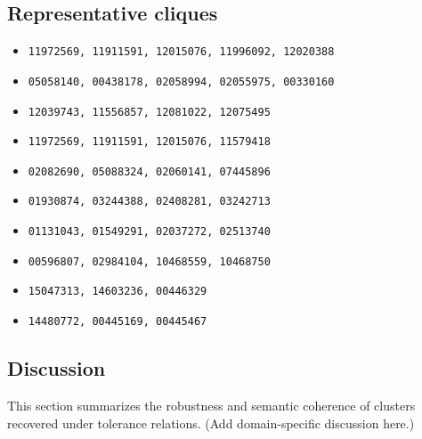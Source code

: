 \subsection{Representative cliques}
\begin{itemize}
\item \texttt{11972569, 11911591, 12015076, 11996092, 12020388}
\item \texttt{05058140, 00438178, 02058994, 02055975, 00330160}
\item \texttt{12039743, 11556857, 12081022, 12075495}
\item \texttt{11972569, 11911591, 12015076, 11579418}
\item \texttt{02082690, 05088324, 02060141, 07445896}
\item \texttt{01930874, 03244388, 02408281, 03242713}
\item \texttt{01131043, 01549291, 02037272, 02513740}
\item \texttt{00596807, 02984104, 10468559, 10468750}
\item \texttt{15047313, 14603236, 00446329}
\item \texttt{14480772, 00445169, 00445467}
\end{itemize}

\subsection{Discussion}
This section summarizes the robustness and semantic coherence of clusters recovered under tolerance relations. (Add domain-specific discussion here.)